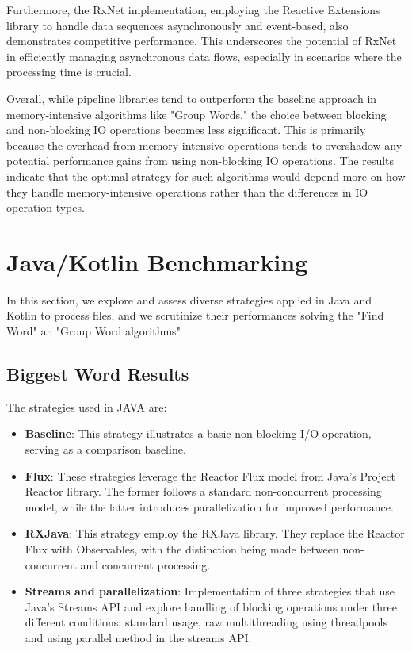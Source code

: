 Furthermore, the RxNet implementation, employing the Reactive Extensions library to handle data sequences asynchronously and event-based, also demonstrates competitive performance. This underscores the potential of RxNet in efficiently managing asynchronous data flows, especially in scenarios where the processing time is crucial.

Overall, while pipeline libraries tend to outperform the baseline approach in memory-intensive algorithms like "Group Words," the choice between blocking and non-blocking IO operations becomes less significant. This is primarily because the overhead from memory-intensive operations tends to overshadow any potential performance gains from using non-blocking IO operations. The results indicate that the optimal strategy for such algorithms would depend more on how they handle memory-intensive operations rather than the differences in IO operation types.
\clearpage

\section{Java/Kotlin Benchmarking}
\label{sec:java_implementation}

In this section, we explore and assess diverse strategies applied in Java and Kotlin to process files, and we scrutinize their performances solving the "Find Word" an "Group Word algorithms"


\subsection{Biggest Word Results}
\label{subsubsec:biggest_word_results}

The strategies used in JAVA are:

\begin{itemize}
    \item \textbf{Baseline}: This strategy illustrates a basic non-blocking I/O operation, serving as a comparison baseline.
    \item \textbf{Flux}: These strategies leverage the Reactor Flux model from Java's Project Reactor library. The former follows a standard non-concurrent processing model, while the latter introduces parallelization for improved performance.
    \item \textbf{RXJava}: This strategy employ the RXJava library. They replace the Reactor Flux with Observables, with the distinction being made between non-concurrent and concurrent processing.
    \item \textbf{Streams and parallelization}: Implementation of three strategies that use Java's Streams API and explore handling of blocking operations under three different conditions: standard usage, raw multithreading using threadpools and using parallel method in the streams API.
    
\end{itemize}


